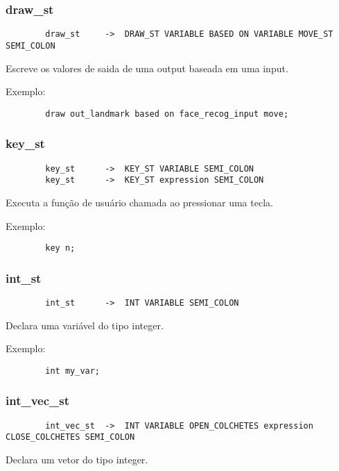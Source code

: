 \documentclass[a4paper,10pt]{article}
\begin{document}
	\subsubsection{draw\_st}
		\begin{lstlisting}
		draw_st		->	DRAW_ST VARIABLE BASED ON VARIABLE MOVE_ST SEMI_COLON
		\end{lstlisting}
		Escreve os valores de saida de uma output baseada em uma input.
		
		Exemplo:
		\begin{lstlisting}
		draw out_landmark based on face_recog_input move;
		\end{lstlisting}
		\vspace{10mm}
	\subsubsection{key\_st}
		\begin{lstlisting}
		key_st		->	KEY_ST VARIABLE SEMI_COLON
		key_st		->	KEY_ST expression SEMI_COLON
		\end{lstlisting}
		Executa a função de usuário chamada ao pressionar uma tecla.
		
		Exemplo:
		\begin{lstlisting}
		key n;
		\end{lstlisting}
		\vspace{10mm}
	\subsubsection{int\_st}
		\begin{lstlisting}
		int_st		->	INT VARIABLE SEMI_COLON
		\end{lstlisting}
		Declara uma vari\'avel do tipo integer.
		
		Exemplo:
		\begin{lstlisting}
		int my_var;
		\end{lstlisting}
		\vspace{10mm}
	\subsubsection{int\_vec\_st}
		\begin{lstlisting}
		int_vec_st	->	INT VARIABLE OPEN_COLCHETES expression CLOSE_COLCHETES SEMI_COLON 
		\end{lstlisting}
		Declara um vetor do tipo integer.
		
\end{document}
